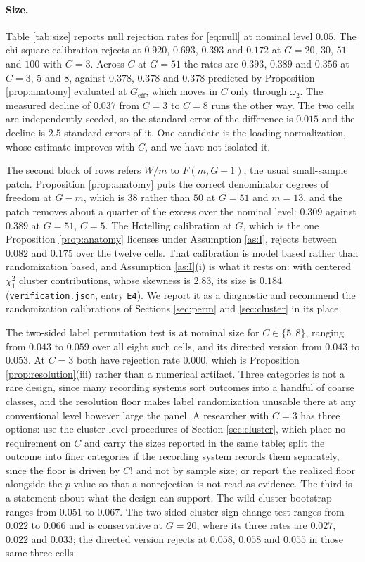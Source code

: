 \documentclass[12pt]{article}
\theoremstyle{definition}
\numberwithin{equation}{section}
\begin{document}
\paragraph{Size.} Table \ref{tab:size} reports null rejection rates for
\eqref{eq:null} at nominal level $0.05$. The chi-square calibration rejects at
$0.920$, $0.693$, $0.393$ and $0.172$ at $G = 20$, $30$, $51$ and $100$ with
$C = 3$. Across $C$ at $G = 51$ the rates are $0.393$, $0.389$ and $0.356$ at
$C = 3$, $5$ and $8$, against $0.378$, $0.378$ and $0.378$ predicted by
Proposition \ref{prop:anatomy} evaluated at $G_{\mathrm{eff}}$, which moves in
$C$ only through $\omega_2$. The measured decline of $0.037$ from $C = 3$ to
$C = 8$ runs the other way. The two cells are independently seeded, so the
standard error of the difference is $0.015$ and the decline is $2.5$ standard
errors of it.
One candidate is the loading normalization, whose estimate improves with $C$,
and we have not isolated it.

The second block of rows refers $W/m$ to $F(m, G-1)$, the usual small-sample patch. Proposition \ref{prop:anatomy} puts the correct denominator degrees of
freedom at $G - m$, which is $38$ rather than $50$ at $G = 51$ and $m = 13$,
and the patch removes about a quarter of the excess over the nominal level:
$0.309$ against $0.389$ at $G = 51$, $C = 5$. The Hotelling calibration at $G$,
which is the one Proposition \ref{prop:anatomy} licenses under Assumption
\ref{as:I}, rejects between $0.082$ and $0.175$ over the twelve cells. That
calibration is model based rather than randomization based, and Assumption
\ref{as:I}(i) is what it rests on: with centered $\chi^2_1$ cluster
contributions, whose skewness is $2.83$, its size is $0.184$
(\texttt{verification.json}, entry \texttt{E4}). We report it as a
diagnostic and recommend the randomization calibrations of Sections
\ref{sec:perm} and \ref{sec:cluster} in its place.

The two-sided label permutation test is at nominal size for $C \in \{5,8\}$,
ranging from $0.043$ to $0.059$ over all eight such cells, and its directed
version from $0.043$ to $0.053$. At $C = 3$ both have rejection rate $0.000$,
which is Proposition \ref{prop:resolution}(iii) rather than a numerical
artifact. Three categories is not a rare design, since many recording systems
sort outcomes into a handful of coarse classes, and the resolution floor makes
label randomization unusable there at any conventional level however large the
panel. A researcher with $C = 3$ has three options: use the cluster level
procedures of Section \ref{sec:cluster}, which place no requirement on $C$ and
carry the sizes reported in the same table; split the outcome into finer
categories if the recording system records them separately, since the floor is
driven by $C!$ and not by sample size; or report the realized floor alongside
the $p$ value so that a nonrejection is not read as evidence. The third is a
statement about what the design can support. The wild cluster bootstrap ranges from $0.051$ to $0.067$. The
two-sided cluster sign-change test ranges from $0.022$ to $0.066$ and is
conservative at $G = 20$, where its three rates are $0.027$, $0.022$ and
$0.033$; the directed version rejects at $0.058$, $0.058$ and $0.055$ in those
same three cells.
\end{document}
